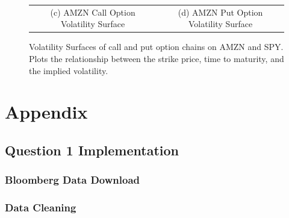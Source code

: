 \documentclass[10pt]{article}
\newcommand*\lstinputpath[1]{\lstset{inputpath=#1}} %
\begin{document}
\begin{figure}
\begin{tabular}{cc}
                (c) AMZN Call Option Volatility Surface &
                (d) AMZN Put Option Volatility Surface
            \end{tabular}
            \label{fig:volatility_surfaces}
            \caption{Volatility Surfaces of call and put option chains on AMZN and SPY. Plots the relationship between the strike price, time to maturity, and the implied volatility.}
        \end{figure}


\newpage

\printbibliography



\newpage

\appendix

\lstinputpath{}

\section{Appendix} \label{appendix:source}

    \subsection{Question 1 Implementation}

        \subsubsection{Bloomberg Data Download} \label{appendix:source:q1:bloomberg}

            
        
        \subsubsection{Data Cleaning} \label{appendix:source:q1:clean}
        
            
    
\end{document}
